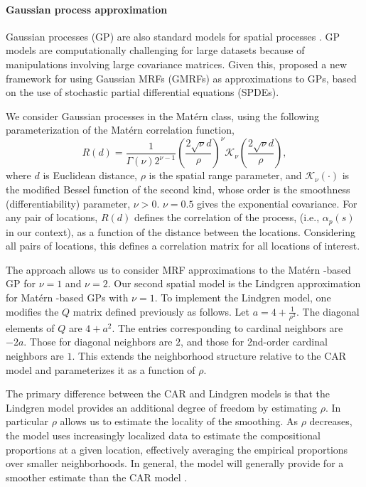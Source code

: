 \documentclass[12pt]{article}
\newcommand{\matern}{Mat\'{e}rn }
\begin{document}
\paragraph{Gaussian process approximation}

Gaussian processes (GP) are also standard models for spatial processes \citep{Bane:etal:2004}.
GP models are computationally challenging for large datasets because
of manipulations involving large covariance matrices. Given this,
\cite{Lind:etal:2011} proposed a new framework for using Gaussian
MRFs (GMRFs) as approximations to GPs, based on the use of stochastic
partial differential equations (SPDEs).

We consider Gaussian processes in the \matern class, using the following
parameterization of the \matern correlation function, 
\begin{equation}
R(d)=\frac{1}{\Gamma(\nu)2^{\nu-1}}\left(\frac{2\sqrt{\nu}d}{\rho}\right)^{\nu}\mathcal{K}_{\nu}\left(\frac{2\sqrt{\nu}d}{\rho}\right),\label{eq:Matern}
\end{equation}
where $d$ is Euclidean distance, $\rho$ is the spatial range parameter,
and $\mathcal{K}_{\nu}(\cdot)$ is the modified Bessel function of
the second kind, whose order is the smoothness (differentiability)
parameter, $\nu>0$. $\nu=0.5$ gives the exponential covariance.
For any pair of locations, $R(d)$ defines the correlation of the
process, (i.e., $\alpha_{p}(s)$ in our context), as a function of
the distance between the locations. Considering all pairs of locations,
this defines a correlation matrix for all locations of interest. 

The \citet{Lind:etal:2011} approach allows us to consider MRF approximations
to the \matern-based GP for $\nu=1$ and $\nu=2$. Our second spatial
model is the Lindgren approximation for \matern-based GPs with $\nu=1$.
To implement the Lindgren model, one modifies the $Q$ matrix defined
previously as follows. Let $a=4+\frac{1}{\rho^{2}}$. The diagonal
elements of $Q$ are $4+a^{2}$. The entries corresponding to cardinal
neighbors are $-2a$. Those for diagonal neighbors are $2$, and those
for 2nd-order cardinal neighbors are $1$. This extends the neighborhood
structure relative to the CAR model and parameterizes it as a function
of $\rho$.

The primary difference between the CAR and Lindgren models is that
the Lindgren model provides an additional degree of freedom by estimating
$\rho$. In particular $\rho$ allows us to estimate the locality
of the smoothing. As $\rho$ decreases, the model uses increasingly
localized data to estimate the compositional proportions at a given
location, effectively averaging the empirical proportions over smaller
neighborhoods. In general, the \cite{Lind:etal:2011} model will generally
provide for a smoother estimate than the CAR model \citep{Paci:2013}. 
\end{document}
